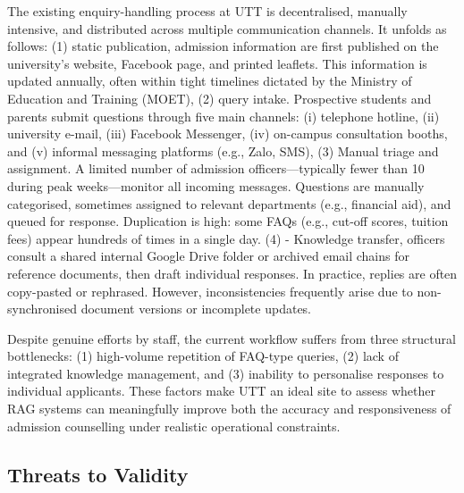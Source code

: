 \documentclass[runningheads]{llncs}
\begin{document}
The existing enquiry-handling process at UTT is decentralised, manually intensive, and distributed across multiple communication channels. It unfolds as follows: (1) static publication, admission information are first published on the university’s website, Facebook page, and printed leaflets. This information is updated annually, often within tight timelines dictated by the Ministry of Education and Training (MOET), (2) query intake. Prospective students and parents submit questions through five main channels: (i) telephone hotline, (ii) university e-mail, (iii) Facebook Messenger, (iv) on-campus consultation booths, and (v) informal messaging platforms (e.g., Zalo, SMS), (3) Manual triage and assignment. A limited number of admission officers—typically fewer than 10 during peak weeks—monitor all incoming messages. Questions are manually categorised, sometimes assigned to relevant departments (e.g., financial aid), and queued for response. Duplication is high: some FAQs (e.g., cut-off scores, tuition fees) appear hundreds of times in a single day. (4) - Knowledge transfer, officers consult a shared internal Google Drive folder or archived email chains for reference documents, then draft individual responses. In practice, replies are often copy-pasted or rephrased. However, inconsistencies frequently arise due to non-synchronised document versions or incomplete updates.

Despite genuine efforts by staff, the current workflow suffers from three structural bottlenecks: (1) high-volume repetition of FAQ-type queries, (2) lack of integrated knowledge management, and (3) inability to personalise responses to individual applicants. These factors make UTT an ideal site to assess whether RAG systems can meaningfully improve both the accuracy and responsiveness of admission counselling under realistic operational constraints.

\subsection{Threats to Validity}
\label{sec:validity}
\end{document}
